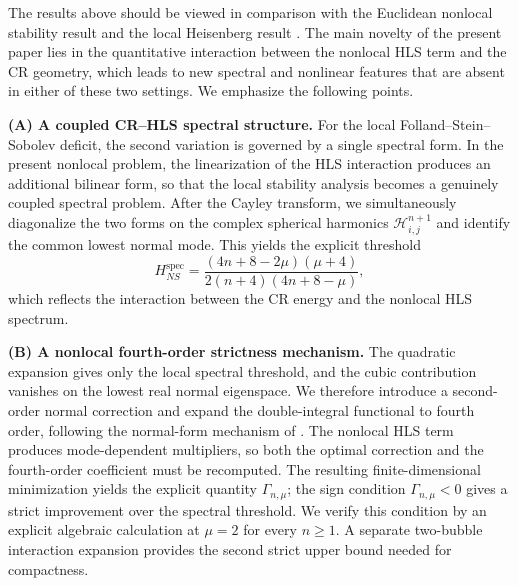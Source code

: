 \documentclass[11pt]{article}
\begin{document}
The results above should be viewed in comparison with the Euclidean nonlocal stability result \cite{Z26} and the local Heisenberg result \cite{TZZ24}. The main novelty of the present paper lies in the quantitative interaction between the nonlocal HLS term and the CR geometry, which leads to new spectral and nonlinear features that are absent in either of these two settings. We emphasize the following points.

\vspace{.2cm}

{\bf (A) A coupled CR--HLS spectral structure.}
For the local Folland--Stein--Sobolev deficit, the second variation is governed by a single spectral form. In the present nonlocal problem, the linearization of the HLS interaction produces an additional bilinear form, so that the local stability analysis becomes a genuinely coupled spectral problem. After the Cayley transform, we simultaneously diagonalize the two forms on the complex spherical harmonics $\mathcal H_{i,j}^{n+1}$ and identify the common lowest normal mode. This yields the explicit threshold
\[
H_{NS}^{\mathrm{spec}}
=\frac{(4n+8-2\mu)(\mu+4)}
{2(n+4)(4n+8-\mu)},
\]
which reflects the interaction between the CR energy and the nonlocal HLS spectrum.

\vspace{.1cm}

{\bf (B) A nonlocal fourth-order strictness mechanism.}
\begingroup
The quadratic expansion gives only the local spectral threshold, and the cubic contribution vanishes on the lowest real normal eigenspace. We therefore introduce a second-order normal correction and expand the double-integral functional to fourth order, following the normal-form mechanism of \cite[Proposition~6.4]{Li26}. The nonlocal HLS term produces mode-dependent multipliers, so both the optimal correction and the fourth-order coefficient must be recomputed. The resulting finite-dimensional minimization yields the explicit quantity $\Gamma_{n,\mu}$; the sign condition $\Gamma_{n,\mu}<0$ gives a strict improvement over the spectral threshold. We verify this condition by an explicit algebraic calculation at $\mu=2$ for every $n\ge1$. A separate two-bubble interaction expansion provides the second strict upper bound needed for compactness.
\endgroup

\vspace{.1cm}
\end{document}
